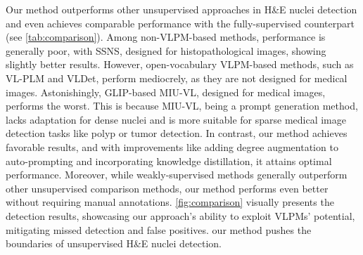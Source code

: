 \documentclass[journal,twoside,web]{ieeecolor}
\begin{document}
Our method outperforms other unsupervised approaches in H\&E nuclei detection and even achieves comparable performance with the fully-supervised counterpart (see \autoref{tab:comparison}). Among non-VLPM-based methods, performance is generally poor, with SSNS, designed for histopathological images, showing slightly better results. However, open-vocabulary VLPM-based methods, such as VL-PLM and VLDet, perform mediocrely, as they are not designed for medical images. Astonishingly, GLIP-based MIU-VL, designed for medical images, performs the worst. This is because MIU-VL, being a prompt generation method, lacks adaptation for dense nuclei and is more suitable for sparse medical image detection tasks like polyp or tumor detection. In contrast, our method achieves favorable results, and with improvements like adding degree augmentation to auto-prompting and incorporating knowledge distillation, it attains optimal performance. Moreover, while weakly-supervised methods generally outperform other unsupervised comparison methods, our method performs even better without requiring manual annotations. \autoref{fig:comparison} visually presents the detection results, showcasing our approach's ability to exploit VLPMs' potential, mitigating missed detection and false positives. our method pushes the boundaries of unsupervised H\&E nuclei detection.
\end{document}
